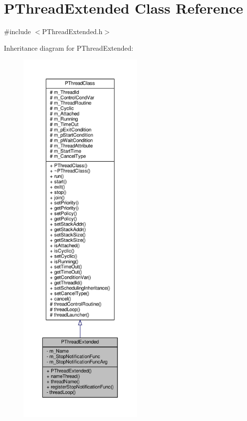 \hypertarget{classPThreadExtended}{}\section{P\+Thread\+Extended Class Reference}
\label{classPThreadExtended}


{\ttfamily \#include $<$P\+Thread\+Extended.\+h$>$}



Inheritance diagram for P\+Thread\+Extended\+:\nopagebreak
\begin{figure}[H]
\begin{center}
\leavevmode
\includegraphics[height=550pt]{classPThreadExtended__inherit__graph}
\end{center}
\end{figure}

